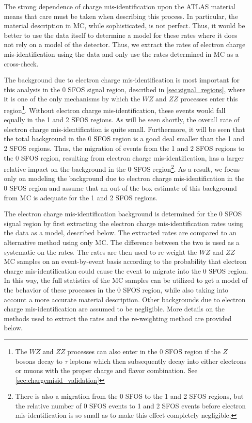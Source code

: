 The strong dependence of charge mis-identification 
upon the ATLAS material means that care must be
taken when describing this process. In particular, the material 
description in MC, while sophisticated, is not perfect. 
Thus, it would be better to use the data itself to determine
a model for these rates where it does not rely on a model of the detector.
Thus, we extract the rates of electron charge 
mis-identification using the data and only use the rates determined
in MC as a cross-check.




The background due to electron charge mis-identification is most important 
for this analysis
in the 0 SFOS signal region, described in \sec\ref{sec:signal_regions},
where it is one of the only mechanisms by which the $WZ$ and $ZZ$ 
processes enter this region\footnote{The $WZ$ and $ZZ$ processes
can also enter in the 0 SFOS region if the $Z$ bosons
decay to $\tau$ leptons which then subsequently decay into 
either electrons or muons with the proper charge and flavor combination.
See \sec\ref{sec:chargemisid_validation}}.
Without electron charge mis-identification, these events would fall
equally in the 1 and 2 SFOS regions.
As will be seen shortly, the overall rate of electron charge mis-identification
is quite small. 
Furthermore, it will be seen that the total background in the 0 SFOS region is 
a good deal smaller than the 1 and 2 SFOS regions. Thus, the
migration of events from the 1 and 2 SFOS regions to the 0 SFOS 
region, resulting from electron charge mis-identification, has
a larger relative impact on the background in the 0 SFOS 
region\footnote{There is also a migration from the 0 SFOS to the 1 and 2 SFOS 
regions, but the relative number of 0 SFOS events to 1 and 2 SFOS
events before electron mis-identification is so small as to make this
effect completely negligible.}.
As a result, we focus only on modeling the background due to electron
charge mis-identification in the 0 SFOS region and assume that an 
out of the box estimate of this background from MC is adequate for the 
1 and 2 SFOS regions.


The electron charge mis-identification background is determined
for the 0 SFOS signal region by first extracting the electron charge
mis-identification rates using the data as a model,
described below. The extracted
rates are compared to an alternative method using only MC. 
The difference between the two is used as a systematic on the
rates. The rates are then used to re-weight the $WZ$ and $ZZ$ MC samples
on an event-by-event basis 
according to the probability that electron charge mis-identification
could cause the event to migrate into the 0 SFOS region. In this way, 
the full statistics of the MC samples can be utilized to get a model of
the behavior of these processes in the 0 SFOS region, while also taking 
into account a more accurate material description. Other backgrounds
due to electron charge mis-identification are assumed to be negligible.
More details on the methods used to extract the rates and the re-weighting
method are provided below.




